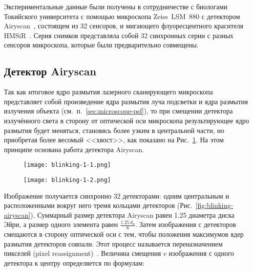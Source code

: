 Экспериментальные данные были получены в сотрудничестве с биологами Токийского университета с помощью микроскопа Zeiss~LSM~880 с детектором Airyscan~\cite{weisshart2014basic}, состоящем из 32 сенсоров, и мигающего флуоресцентного красителя HMSiR~\cite{uno2014spontaneously}. Серия снимков представляла собой 32 синхронных серии с разных сенсоров микроскопа, которые были предварительно совмещены.

\subsection{Детектор Airyscan}


Так как итоговое ядро размытия лазерного сканирующего микроскопа представляет собой произведение ядра размытия луча подсветки и ядра размытия излучения объекта (см.~п.~\ref{sec:microscope-psf}), то при смещении детектора излучённого света в сторону от оптической оси микроскопа результирующее ядро размытия будет меняться, становясь более узким в центральной части, но приобретая более весомый <<хвост>>, как показано на Рис.~\ref{fig:blinking-psf-displacement}. На этом принципе основана работа детектора Airyscan.

\begin{figure}[ht]
	\hfill
	\centering
	\begin{minipage}{0.45\textwidth}
		\centering
		\texttt{[image: blinking-1-1.png]}
		\label{fig:blinking-psf}
	\end{minipage} \hfill
	\begin{minipage}{0.45\textwidth}
		\centering
		\texttt{[image: blinking-1-2.png]}
		\label{fig:blinking-psf-displacement}
	\end{minipage}
	\hfill
\end{figure}

Изображение получается синхронно 32 детекторами: одним центральным и расположенными вокруг него тремя кольцами детекторов (Рис.~\ref{fig:blinking-airyscan}). Суммарный размер детектора Airyscan равен 1.25 диаметра диска Эйри, а размер одного элемента равен $\frac{1.25\ d_a}{6}$. Затем изображения с детекторов смещаются в сторону оптической оси с тем, чтобы положения максимумов ядер размытия детекторов совпали. Этот процесс называется переназначением пикселей (pixel reassignment)~\cite{sheppard2013superresolution}. Величина смещения $v$ изображения с одного детектора к центру определяется по формулам:

